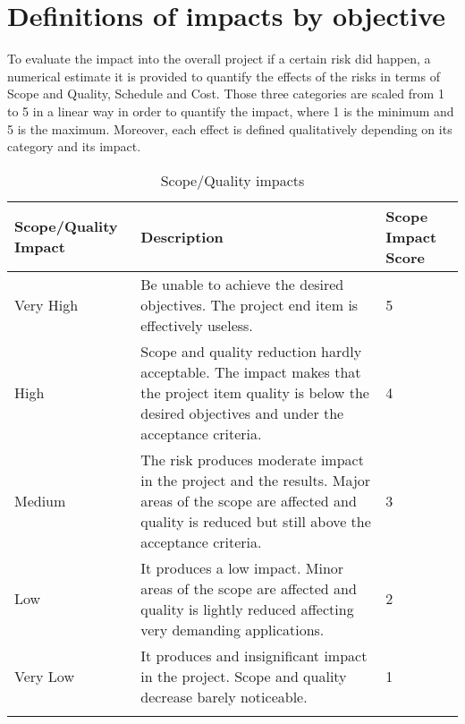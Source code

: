 \section{Definitions of impacts by objective}

To evaluate the impact into the overall project if a certain risk did happen, a numerical estimate it is provided to quantify the effects of the risks in terms of Scope and Quality, Schedule and Cost. Those three categories are scaled from 1 to 5 in a linear way in order to quantify the impact, where 1 is the minimum and 5 is the maximum. Moreover, each effect is defined qualitatively depending on its category and its impact. 

\begin{longtable}[H]{l >{\raggedright\arraybackslash}p{6.3cm} p{3.5cm}}
	
	\toprule[2pt]
	
	\textbf{Scope/Quality Impact} &  \textbf{Description}  & \textbf{Scope Impact Score} \\
	
	\midrule [1.5pt]
	\endhead
	
	Very High & Be unable to achieve the desired objectives. The project end item is effectively useless. & 5 
	\vspace{0.2cm} \\
	
	\midrule
	
	High & Scope and quality reduction hardly acceptable. The impact makes that the project item quality is below the desired objectives and under the acceptance criteria. & 4 
	\vspace{0.2cm} \\
	
	\midrule
	
	Medium & The risk produces moderate impact in the project and the results. Major areas of the scope are affected and quality is reduced but still above the acceptance criteria. & 3
	\vspace{0.2cm} \\

	\midrule

	Low & It produces a low impact. Minor areas of the scope are affected and quality is lightly reduced affecting very demanding applications. & 2
	\vspace{0.2cm} \\

	\midrule

	Very Low & It produces and insignificant impact in the project. Scope and quality decrease barely noticeable. & 1
	\vspace{0.2cm} \\
		
	\bottomrule[2pt]
	
	\caption{Scope/Quality impacts}

\end{longtable}




